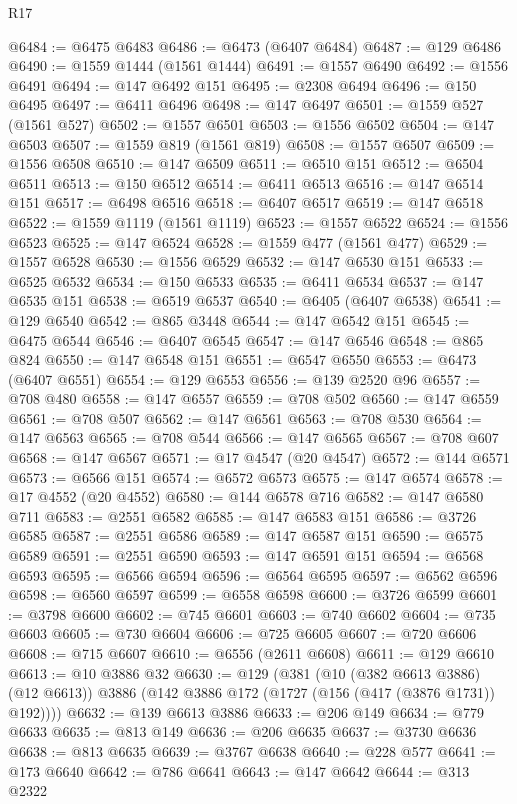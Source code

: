 \begin{lexlean}{R17}
\begin{coremodule}
@6484 := @6475 @6483
@6486 := @6473 (@6407 @6484)
@6487 := @129 @6486
@6490 := @1559 @1444 (@1561 @1444)
@6491 := @1557 @6490
@6492 := @1556 @6491
@6494 := @147 @6492 @151
@6495 := @2308 @6494
@6496 := @150 @6495
@6497 := @6411 @6496
@6498 := @147 @6497
@6501 := @1559 @527 (@1561 @527)
@6502 := @1557 @6501
@6503 := @1556 @6502
@6504 := @147 @6503
@6507 := @1559 @819 (@1561 @819)
@6508 := @1557 @6507
@6509 := @1556 @6508
@6510 := @147 @6509
@6511 := @6510 @151
@6512 := @6504 @6511
@6513 := @150 @6512
@6514 := @6411 @6513
@6516 := @147 @6514 @151
@6517 := @6498 @6516
@6518 := @6407 @6517
@6519 := @147 @6518
@6522 := @1559 @1119 (@1561 @1119)
@6523 := @1557 @6522
@6524 := @1556 @6523
@6525 := @147 @6524
@6528 := @1559 @477 (@1561 @477)
@6529 := @1557 @6528
@6530 := @1556 @6529
@6532 := @147 @6530 @151
@6533 := @6525 @6532
@6534 := @150 @6533
@6535 := @6411 @6534
@6537 := @147 @6535 @151
@6538 := @6519 @6537
@6540 := @6405 (@6407 @6538)
@6541 := @129 @6540
@6542 := @865 @3448
@6544 := @147 @6542 @151
@6545 := @6475 @6544
@6546 := @6407 @6545
@6547 := @147 @6546
@6548 := @865 @824
@6550 := @147 @6548 @151
@6551 := @6547 @6550
@6553 := @6473 (@6407 @6551)
@6554 := @129 @6553
@6556 := @139 @2520 @96
@6557 := @708 @480
@6558 := @147 @6557
@6559 := @708 @502
@6560 := @147 @6559
@6561 := @708 @507
@6562 := @147 @6561
@6563 := @708 @530
@6564 := @147 @6563
@6565 := @708 @544
@6566 := @147 @6565
@6567 := @708 @607
@6568 := @147 @6567
@6571 := @17 @4547 (@20 @4547)
@6572 := @144 @6571
@6573 := @6566 @151
@6574 := @6572 @6573
@6575 := @147 @6574
@6578 := @17 @4552 (@20 @4552)
@6580 := @144 @6578 @716
@6582 := @147 @6580 @711
@6583 := @2551 @6582
@6585 := @147 @6583 @151
@6586 := @3726 @6585
@6587 := @2551 @6586
@6589 := @147 @6587 @151
@6590 := @6575 @6589
@6591 := @2551 @6590
@6593 := @147 @6591 @151
@6594 := @6568 @6593
@6595 := @6566 @6594
@6596 := @6564 @6595
@6597 := @6562 @6596
@6598 := @6560 @6597
@6599 := @6558 @6598
@6600 := @3726 @6599
@6601 := @3798 @6600
@6602 := @745 @6601
@6603 := @740 @6602
@6604 := @735 @6603
@6605 := @730 @6604
@6606 := @725 @6605
@6607 := @720 @6606
@6608 := @715 @6607
@6610 := @6556 (@2611 @6608)
@6611 := @129 @6610
@6613 := @10 @3886 @32
@6630 := @129
    (@381
      (@10 (@382 @6613 @3886) (@12 @6613))
      @3886
      (@142 @3886 @172 (@1727 (@156 (@417 (@3876 @1731)) @192))))
@6632 := @139 @6613 @3886
@6633 := @206 @149
@6634 := @779 @6633
@6635 := @813 @149
@6636 := @206 @6635
@6637 := @3730 @6636
@6638 := @813 @6635
@6639 := @3767 @6638
@6640 := @228 @577
@6641 := @173 @6640
@6642 := @786 @6641
@6643 := @147 @6642
@6644 := @313 @2322

\end{coremodule}
\end{lexlean}
